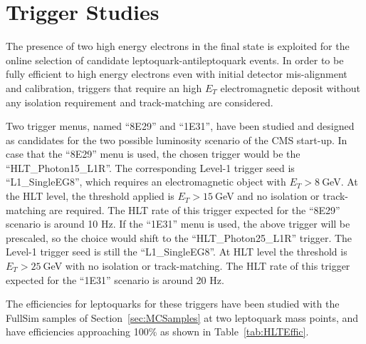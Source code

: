 %
\section{Trigger Studies} \label{sec:trig}

The presence of two high energy electrons in the final state is exploited for the online selection 
of candidate leptoquark-antileptoquark events.
In order to be fully efficient to high energy electrons even with initial detector mis-alignment 
and calibration, triggers that require an high $E_T$ electromagnetic deposit without any isolation 
requirement and track-matching are considered.

Two trigger menus, named ``8E29'' and ``1E31'', have been studied and designed as candidates for 
the two possible luminosity scenario of the CMS start-up.
In case that the ``8E29'' menu is used, the chosen trigger would be the ``HLT\_Photon15\_L1R''.
The corresponding Level-1 trigger seed is ``L1\_SingleEG8'', which requires an electromagnetic object with 
$E_T>8~$GeV. At the HLT level, the threshold applied is $E_T>15~$GeV and no isolation or track-matching
are required. The HLT rate of this trigger expected for the ``8E29'' scenario is around 10 Hz.
If the ``1E31'' menu is used, the above trigger will be prescaled, so the choice would shift to the
``HLT\_Photon25\_L1R'' trigger. The Level-1 trigger seed is still the ``L1\_SingleEG8''. At HLT level the 
threshold is $E_T>25~$GeV with no isolation or track-matching. 
The HLT rate of this trigger expected for the ``1E31'' scenario is around 20 Hz.

The efficiencies for leptoquarks for these triggers have been studied with the FullSim 
samples of Section~\ref{sec:MCSamples} at two leptoquark mass points, and have efficiencies approaching
100\% as shown in Table~\ref{tab:HLTEffic}.

